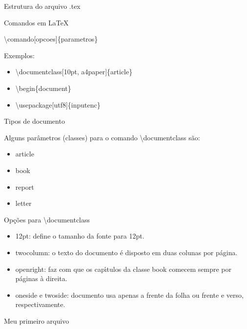 \documentclass{beamer}
\newcommand{\tbs}{\textbackslash}
\begin{document}
\begin{frame}[fragile]{Estrutura do arquivo .tex}
    
\end{frame}

\begin{frame}{Comandos em \LaTeX}
    \begin{centering}
        \textbackslash comando[opcoes]\{parametros\}
    \end{centering}

    \vspace{1cm}
    Exemplos:
    \begin{itemize}
        \item \textbackslash documentclass[10pt, a4paper]\{article\}
        \item \tbs begin\{document\}
        \item \textbackslash usepackage[utf8]\{inputenc\}
    \end{itemize}
\end{frame}

\begin{frame}{Tipos de documento}

    Alguns par\^ametros (classes) para o comando \tbs documentclass s\~ao:
    \begin{itemize}
        \item article
        \item book
        \item report
        \item letter
    \end{itemize}
\end{frame}

\begin{frame}{Op\c{c}\~oes para \tbs documentclass}
    \begin{itemize}
        \item 12pt: define o tamanho da fonte para 12pt.
        \item twocolumn: o texto do documento \'e disposto em duas colunas por p\'agina.
        \item openright: faz com que os cap\'{\i}tulos da classe book comecem sempre
        por p\'aginas \`a direita.
        \item oneside e twoside: documento usa apenas a frente da folha ou
        frente e verso, respectivamente.
    \end{itemize}
\end{frame}

\begin{frame}{Meu primeiro arquivo}
    
\end{frame}
\end{document}
